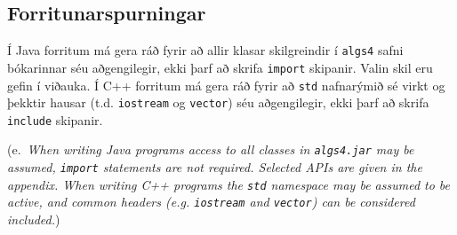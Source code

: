 \documentclass[addpoints]{exam}
\newcommand{\eng}[1]{(e.\ \emph{#1})}
\begin{document}
\begin{questions}
\newpage

\section{Forritunarspurningar}

Í Java forritum má gera ráð fyrir að allir klasar skilgreindir í \texttt{algs4} safni bókarinnar séu aðgengilegir, ekki þarf að skrifa \texttt{import} skipanir. Valin skil eru gefin í viðauka. Í C++ forritum má gera ráð fyrir að \texttt{std} nafnarýmið sé virkt og þekktir hausar (t.d. \texttt{iostream} og \texttt{vector}) séu aðgengilegir, ekki þarf að skrifa \texttt{include} skipanir.

\eng{When writing Java programs access to all classes in \texttt{algs4.jar} may be assumed, \texttt{import} statements are not required. Selected APIs are given in the appendix. When writing C++ programs the \texttt{std} namespace may be assumed to be active, and common headers (e.g. \texttt{iostream} and \texttt{vector}) can be considered included.}


\end{questions}
\end{document}
